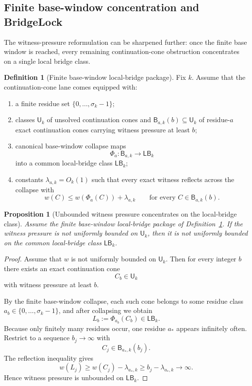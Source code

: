 \documentclass[11pt]{article}
\newtheorem{proposition}[theorem]{Proposition}
\theoremstyle{definition}
\newtheorem{definition}[theorem]{Definition}
\newcommand{\1}{\mathbf{1}}
\begin{document}
\subsection*{Finite base-window concentration and BridgeLock}
The witness-pressure reformulation can be sharpened further: once the finite base window is reached, every remaining continuation-cone obstruction concentrates on a single local bridge class.

\begin{definition}[Finite base-window local-bridge package]\label{def:bridgelock-package}
Fix $k$. Assume that the continuation-cone lane comes equipped with:
\begin{enumerate}[label=(\roman*),leftmargin=2.2em]
\item a finite residue set $\{0,\dots,\sigma_k-1\}$;
\item classes $\mathsf U_k$ of unsolved continuation cones and $\mathsf B_{a,k}(b)\subseteq \mathsf U_k$ of residue-$a$ exact continuation cones carrying witness pressure at least $b$;
\item canonical base-window collapse maps
\[
\Phi_a:\mathsf B_{a,k}\longrightarrow \mathsf{LB}_k
\]
into a common local-bridge class $\mathsf{LB}_k$;
\item constants $\lambda_{a,k}=O_k(1)$ such that every exact witness reflects across the collapse with
\[
w(C)\le w(\Phi_a(C))+\lambda_{a,k}
\qquad\text{for every }C\in \mathsf B_{a,k}(b).
\]
\end{enumerate}
\end{definition}

\begin{proposition}[Unbounded witness pressure concentrates on the local-bridge class]\label{prop:bridgelock-concentration}
Assume the finite base-window local-bridge package of Definition~\ref{def:bridgelock-package}. If the witness pressure is not uniformly bounded on $\mathsf U_k$, then it is not uniformly bounded on the common local-bridge class $\mathsf{LB}_k$.
\end{proposition}

\begin{proof}
Assume that $w$ is not uniformly bounded on $\mathsf U_k$. Then for every integer $b$ there exists an exact continuation cone
\[
C_b\in \mathsf U_k
\]
with witness pressure at least $b$.

By the finite base-window collapse, each such cone belongs to some residue class $a_b\in\{0,\dots,\sigma_k-1\}$, and after collapsing we obtain
\[
L_b:=\Phi_{a_b}(C_b)\in \mathsf{LB}_k.
\]
Because only finitely many residues occur, one residue $a_*$ appears infinitely often. Restrict to a sequence $b_j\to\infty$ with
\[
C_j\in \mathsf B_{a_*,k}(b_j).
\]
The reflection inequality gives
\[
w(L_j)\ge w(C_j)-\lambda_{a_*,k}\ge b_j-\lambda_{a_*,k}\to\infty.
\]
Hence witness pressure is unbounded on $\mathsf{LB}_k$.
\end{proof}
\end{document}

